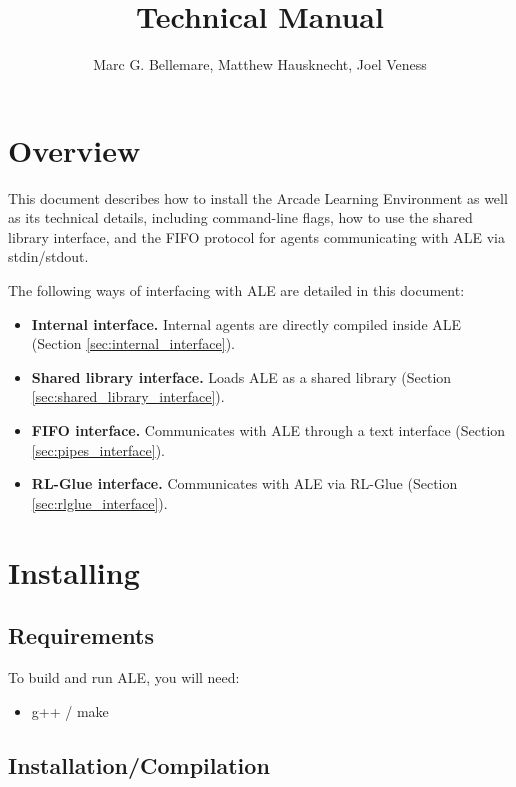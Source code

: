 \documentclass[12pt]{article}
\title{Technical Manual}
\author{Marc G. Bellemare, Matthew Hausknecht, Joel Veness}
\begin{document}
\maketitle
\tableofcontents

\section{Overview}

This document describes how to install the Arcade Learning Environment as well as its technical 
details, including 
command-line flags, how to use the shared library interface, and the FIFO protocol 
for agents communicating with ALE via stdin/stdout.

The following ways of interfacing with ALE are detailed in this document:

\begin{itemize}
  \item{\textbf{Internal interface.} Internal agents are directly compiled inside ALE (Section \ref{sec:internal_interface}).}
  \item{\textbf{Shared library interface.} Loads ALE as a shared library (Section \ref{sec:shared_library_interface}).}
  \item{\textbf{FIFO interface.} Communicates with ALE through a text interface (Section \ref{sec:pipes_interface}).}
  \item{\textbf{RL-Glue interface.} Communicates with ALE via RL-Glue (Section \ref{sec:rlglue_interface}).}
\end{itemize}

\section{Installing}

\subsection{Requirements}

To build and run ALE, you will need:

\begin{itemize}
  \item{g++ / make}
\end{itemize}

\subsection{Installation/Compilation}
\end{document}
